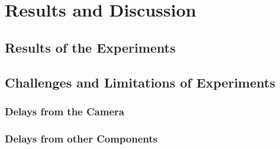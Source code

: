 \chapter{Results and Discussion}

\section{Results of the Experiments}

\section{Challenges and Limitations of Experiments}

\subsection{Delays from the Camera}

\subsection{Delays from other Components}